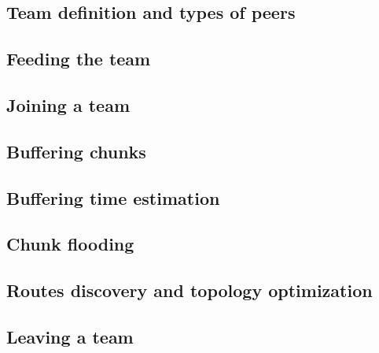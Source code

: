 

\label{sec:DBS}


\subsection{Team definition and types of peers}


\subsection{Feeding the team}


\subsection{Joining a team}


\subsection{Buffering chunks}


\subsection{Buffering time estimation}


\subsection{Chunk flooding}


\subsection{Routes discovery and topology optimization}


%

\subsection{Leaving a team}


